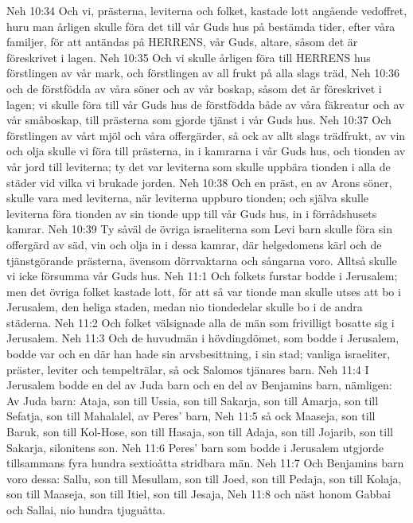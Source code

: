 Neh 10:34  Och vi, prästerna, leviterna och folket, kastade lott angående vedoffret, huru man årligen skulle föra det till vår Guds hus på bestämda tider, efter våra familjer, för att antändas på HERRENS, vår Guds, altare, såsom det är föreskrivet i lagen.
Neh 10:35  Och vi skulle årligen föra till HERRENS hus förstlingen av vår mark, och förstlingen av all frukt på alla slags träd,
Neh 10:36  och de förstfödda av våra söner och av vår boskap, såsom det är föreskrivet i lagen; vi skulle föra till vår Guds hus de förstfödda både av våra fäkreatur och av vår småboskap, till prästerna som gjorde tjänst i vår Guds hus.
Neh 10:37  Och förstlingen av vårt mjöl och våra offergärder, så ock av allt slags trädfrukt, av vin och olja skulle vi föra till prästerna, in i kamrarna i vår Guds hus, och tionden av vår jord till leviterna; ty det var leviterna som skulle uppbära tionden i alla de städer vid vilka vi brukade jorden.
Neh 10:38  Och en präst, en av Arons söner, skulle vara med leviterna, när leviterna uppburo tionden; och själva skulle leviterna föra tionden av sin tionde upp till vår Guds hus, in i förrådshusets kamrar.
Neh 10:39  Ty såväl de övriga israeliterna som Levi barn skulle föra sin offergärd av säd, vin och olja in i dessa kamrar, där helgedomens kärl och de tjänstgörande prästerna, ävensom dörrvaktarna och sångarna voro. Alltså skulle vi icke försumma vår Guds hus.
Neh 11:1  Och folkets furstar bodde i Jerusalem; men det övriga folket kastade lott, för att så var tionde man skulle utses att bo i Jerusalem, den heliga staden, medan nio tiondedelar skulle bo i de andra städerna.
Neh 11:2  Och folket välsignade alla de män som frivilligt bosatte sig i Jerusalem.
Neh 11:3  Och de huvudmän i hövdingdömet, som bodde i Jerusalem, bodde var och en där han hade sin arvsbesittning, i sin stad; vanliga israeliter, präster, leviter och tempelträlar, så ock Salomos tjänares barn.
Neh 11:4  I Jerusalem bodde en del av Juda barn och en del av Benjamins barn, nämligen: Av Juda barn: Ataja, son till Ussia, son till Sakarja, son till Amarja, son till Sefatja, son till Mahalalel, av Peres' barn,
Neh 11:5  så ock Maaseja, son till Baruk, son till Kol-Hose, son till Hasaja, son till Adaja, son till Jojarib, son till Sakarja, silonitens son.
Neh 11:6  Peres' barn som bodde i Jerusalem utgjorde tillsammans fyra hundra sextioåtta stridbara män.
Neh 11:7  Och Benjamins barn voro dessa: Sallu, son till Mesullam, son till Joed, son till Pedaja, son till Kolaja, son till Maaseja, son till Itiel, son till Jesaja,
Neh 11:8  och näst honom Gabbai och Sallai, nio hundra tjuguåtta.
